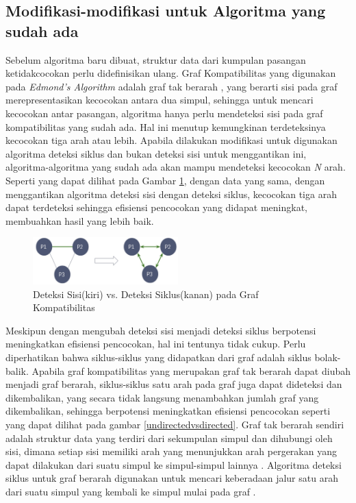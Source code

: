 \documentclass[conference]{IEEEtran}
\begin{document}
\subsection{Modifikasi-modifikasi untuk Algoritma yang sudah ada}
Sebelum algoritma baru dibuat, struktur data dari kumpulan pasangan ketidakcocokan perlu didefinisikan ulang. Graf Kompatibilitas
yang digunakan pada \textit{Edmond's Algorithm} adalah graf tak berarah \cite{raja}, yang berarti sisi pada graf merepresentasikan
kecocokan antara dua simpul, sehingga untuk mencari kecocokan antar pasangan, algoritma hanya perlu mendeteksi sisi pada graf kompatibilitas
yang sudah ada. Hal ini menutup kemungkinan terdeteksinya kecocokan tiga arah atau lebih. Apabila dilakukan modifikasi untuk digunakan
algoritma deteksi siklus dan bukan deteksi sisi untuk menggantikan ini, algoritma-algoritma yang sudah ada akan mampu mendeteksi
kecocokan \textit{N} arah.
Seperti yang dapat dilihat pada Gambar \ref{edgevscycle}, dengan data yang sama, dengan menggantikan algoritma deteksi sisi dengan
deteksi siklus, kecocokan tiga arah dapat terdeteksi sehingga efisiensi pencocokan yang didapat meningkat, membuahkan hasil yang lebih baik.

\begin{figure}[h]
    \includegraphics[width=0.5\textwidth]{images/edge-vs-cycle-detection.jpg}
    \caption{Deteksi Sisi(kiri) vs. Deteksi Siklus(kanan) pada Graf Kompatibilitas}
    \label{edgevscycle}
\end{figure}

Meskipun dengan mengubah deteksi sisi menjadi deteksi siklus berpotensi meningkatkan efisiensi pencocokan, hal ini
tentunya tidak cukup. Perlu diperhatikan bahwa siklus-siklus yang didapatkan dari graf adalah siklus bolak-balik.
Apabila graf kompatibilitas yang merupakan graf tak berarah dapat diubah menjadi graf berarah, siklus-siklus satu arah
pada graf juga dapat dideteksi dan dikembalikan, yang secara tidak langsung menambahkan jumlah graf yang dikembalikan,
sehingga berpotensi meningkatkan efisiensi pencocokan seperti yang dapat dilihat pada gambar \ref{undirectedvsdirected}.
Graf tak berarah sendiri adalah struktur data yang terdiri dari sekumpulan simpul dan dihubungi oleh sisi, dimana
setiap sisi memiliki arah yang menunjukkan arah pergerakan yang dapat  dilakukan dari suatu simpul ke simpul-simpul
lainnya \cite{sedgewick}. Algoritma deteksi siklus untuk graf berarah digunakan untuk mencari keberadaan jalur satu
arah dari suatu simpul yang kembali ke simpul mulai pada graf \cite{mehta}.
\end{document}
